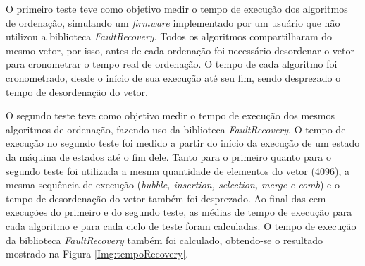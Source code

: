 O primeiro teste teve como objetivo medir o tempo de execução dos algoritmos de ordenação, simulando um \textit{firmware} implementado por um usuário que não utilizou a biblioteca \textit{FaultRecovery}. Todos os algoritmos compartilharam do mesmo vetor, por isso, antes de cada ordenação foi necessário desordenar o vetor para cronometrar o tempo real de ordenação. O tempo de cada algoritmo foi cronometrado, desde o início de sua execução até seu fim, sendo desprezado o tempo de desordenação do vetor.

O segundo teste teve como objetivo medir o tempo de execução dos mesmos algoritmos de ordenação, fazendo uso da biblioteca \textit{FaultRecovery}. O tempo de execução no segundo teste foi medido a partir do início da execução de um estado da máquina de estados até o fim dele. Tanto para o primeiro quanto para o segundo teste foi utilizada a mesma quantidade de elementos do vetor (4096), a mesma sequência de execução (\textit{bubble, insertion, selection, merge} \textit{e comb}) e o tempo de desordenação do vetor também foi desprezado. Ao final das cem execuções do primeiro e do segundo teste, as médias de tempo de execução para cada algoritmo e para cada ciclo de teste foram calculadas. O tempo de execução da biblioteca \textit{FaultRecovery} também foi calculado, obtendo-se o resultado mostrado na Figura \ref{Img:tempoRecovery}.

